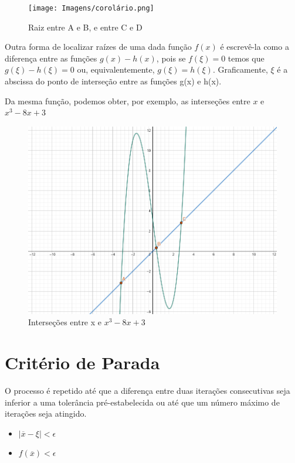 \begin{figure}[h]
    \centering
    \texttt{[image: Imagens/corolário.png]}
    \caption{Raiz entre A e B, e entre C e D}
    \label{fig:coro}
\end{figure}

\newpage

Outra forma de localizar raízes de uma dada função $f(x)$ é escrevê-la como a diferença entre as funções $g(x)-h(x)$, pois se $f(\xi) = 0$ temos que $g(\xi) - h(\xi) = 0$ ou, equivalentemente, $g(\xi) = h(\xi)$. Graficamente, $\xi$ é a abscissa do ponto de interseção entre as funções g(x) e h(x).

Da mesma função, podemos obter, por exemplo, as interseções entre $x$ e $x^3 - 8x + 3$
\begin{figure}[h]
    \centering
    \includegraphics[height = 0.5\textwidth]{Imagens/interseções.png}
    \caption{Interseções entre x e $x^3 - 8x + 3$}
    \label{fig:inters}
\end{figure}

\section{Critério de Parada}
O processo é repetido até que a diferença entre duas iterações consecutivas seja inferior a uma tolerância pré-estabelecida %
ou até que um número máximo de iterações seja atingido.

\begin{itemize} %
    \item $|\overline{x} - \xi| < \epsilon$ %
    \item $f(\overline{x}) < \epsilon$
\end{itemize}

